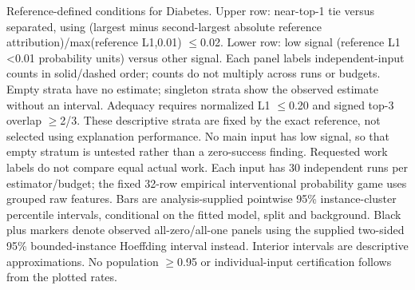 Reference-defined conditions for Diabetes. Upper row: near-top-1 tie versus separated, using (largest minus second-largest absolute reference attribution)/max(reference L1,0.01) $\leq$0.02. Lower row: low signal (reference L1 <0.01 probability units) versus other signal. Each panel labels independent-input counts in solid/dashed order; counts do not multiply across runs or budgets. Empty strata have no estimate; singleton strata show the observed estimate without an interval. Adequacy requires normalized L1 $\leq$0.20 and signed top-3 overlap $\geq$2/3. These descriptive strata are fixed by the exact reference, not selected using explanation performance. No main input has low signal, so that empty stratum is untested rather than a zero-success finding. Requested work labels do not compare equal actual work. Each input has 30 independent runs per estimator/budget; the fixed 32-row empirical interventional probability game uses grouped raw features. Bars are analysis-supplied pointwise 95\% instance-cluster percentile intervals, conditional on the fitted model, split and background. Black plus markers denote observed all-zero/all-one panels using the supplied two-sided 95\% bounded-instance Hoeffding interval instead. Interior intervals are descriptive approximations. No population $\geq$0.95 or individual-input certification follows from the plotted rates.

